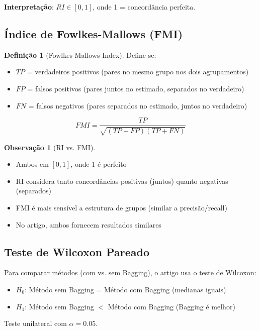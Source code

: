 \documentclass[12pt,a4paper]{article}
\theoremstyle{definition}
\newtheorem{definicao}{Definição}[section]
\newtheorem{observacao}{Observação}[section]
\begin{document}
\textbf{Interpretação}: $RI \in [0, 1]$, onde 1 = concordância perfeita.

\subsection{Índice de Fowlkes-Mallows (FMI)}

\begin{definicao}[Fowlkes-Mallows Index]
Define-se:
\begin{itemize}
    \item $TP$ = verdadeiros positivos (pares no mesmo grupo nos dois agrupamentos)
    \item $FP$ = falsos positivos (pares juntos no estimado, separados no verdadeiro)
    \item $FN$ = falsos negativos (pares separados no estimado, juntos no verdadeiro)
\end{itemize}

\begin{equation}
FMI = \frac{TP}{\sqrt{(TP+FP)(TP+FN)}}
\end{equation}
\end{definicao}

\begin{observacao}[RI vs.
FMI]
\begin{itemize}
    \item Ambos em $[0,1]$, onde 1 é perfeito
    \item RI considera tanto concordâncias positivas (juntos) quanto negativas (separados)
    \item FMI é mais sensível a estrutura de grupos (similar a precisão/recall)
    \item No artigo, ambos fornecem resultados similares
\end{itemize}
\end{observacao}

\subsection{Teste de Wilcoxon Pareado}

Para comparar métodos (com vs.
sem Bagging), o artigo usa o teste de Wilcoxon:

\begin{tcolorbox}[caixaconceito={Hipóteses do Teste}]
\begin{itemize}
    \item $H_0$: Método sem Bagging = Método com Bagging (medianas iguais)
    \item $H_1$: Método sem Bagging $<$ Método com Bagging (Bagging é melhor)
\end{itemize}
Teste unilateral com $\alpha = 0.05$.
\end{tcolorbox}
\end{document}
